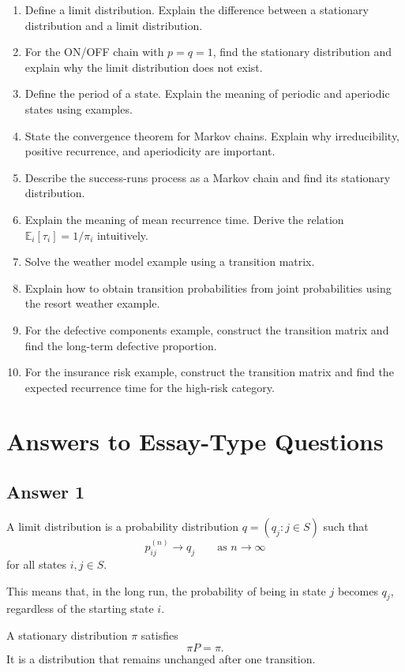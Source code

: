 \documentclass[12pt,a4paper]{article}
\theoremstyle{lecturestyle}
\newcommand{\E}{\mathbb{E}}
\begin{document}
\begin{enumerate}[label=\textbf{Q\arabic*.}, leftmargin=1.2cm]
    \item Define a limit distribution. Explain the difference between a stationary distribution and a limit distribution.
    \item For the ON/OFF chain with $p=q=1$, find the stationary distribution and explain why the limit distribution does not exist.
    \item Define the period of a state. Explain the meaning of periodic and aperiodic states using examples.
    \item State the convergence theorem for Markov chains. Explain why irreducibility, positive recurrence, and aperiodicity are important.
    \item Describe the success-runs process as a Markov chain and find its stationary distribution.
    \item Explain the meaning of mean recurrence time. Derive the relation $\E_i[\tau_i]=1/\pi_i$ intuitively.
    \item Solve the weather model example using a transition matrix.
    \item Explain how to obtain transition probabilities from joint probabilities using the resort weather example.
    \item For the defective components example, construct the transition matrix and find the long-term defective proportion.
    \item For the insurance risk example, construct the transition matrix and find the expected recurrence time for the high-risk category.
\end{enumerate}

\section{Answers to Essay-Type Questions}

\subsection*{Answer 1}

A limit distribution is a probability distribution $q=(q_j:j\in S)$ such that
\[
p_{ij}^{(n)}\to q_j
\qquad\text{as }n\to\infty
\]
for all states $i,j\in S$.

This means that, in the long run, the probability of being in state $j$ becomes $q_j$, regardless of the starting state $i$.

A stationary distribution $\pi$ satisfies
\[
\pi P=\pi.
\]
It is a distribution that remains unchanged after one transition.
\end{document}
